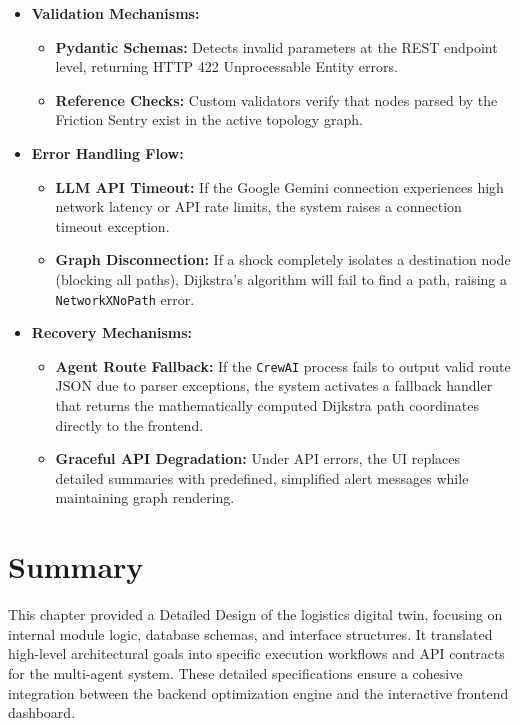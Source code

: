 \begin{itemize}
    \item \textbf{Validation Mechanisms:}
    \begin{itemize}
        \item \textbf{Pydantic Schemas:} Detects invalid parameters at the REST endpoint level, returning HTTP 422 Unprocessable Entity errors.
        \item \textbf{Reference Checks:} Custom validators verify that nodes parsed by the Friction Sentry exist in the active topology graph.
    \end{itemize}
    \item \textbf{Error Handling Flow:}
    \begin{itemize}
        \item \textbf{LLM API Timeout:} If the Google Gemini connection experiences high network latency or API rate limits, the system raises a connection timeout exception.
        \item \textbf{Graph Disconnection:} If a shock completely isolates a destination node (blocking all paths), Dijkstra's algorithm will fail to find a path, raising a \texttt{NetworkXNoPath} error.
    \end{itemize}
    \item \textbf{Recovery Mechanisms:}
    \begin{itemize}
        \item \textbf{Agent Route Fallback:} If the \texttt{CrewAI} process fails to output valid route JSON due to parser exceptions, the system activates a fallback handler that returns the mathematically computed Dijkstra path coordinates directly to the frontend.
        \item \textbf{Graceful API Degradation:} Under API errors, the UI replaces detailed summaries with predefined, simplified alert messages while maintaining graph rendering.
    \end{itemize}
\end{itemize}








\section[Summary]{Summary}
This chapter provided a Detailed Design of the logistics digital twin, focusing on internal module logic, database schemas, and interface structures. It translated high-level architectural goals into specific execution workflows and API contracts for the multi-agent system. These detailed specifications ensure a cohesive integration between the backend optimization engine and the interactive frontend dashboard.
